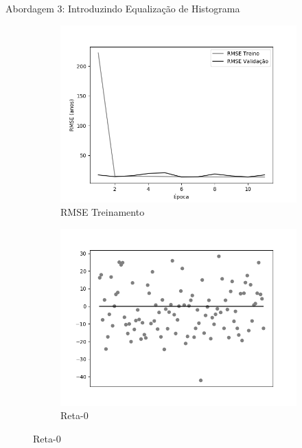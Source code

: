 \begin{frame}{\large{Abordagem 3: Introduzindo Equalização de Histograma}}
  \begin{figure}[ht!]
    \caption{Resultados do treinamento e teste da CNN AlexNet \emph{ReLU}}\label{fig:alexnet-abordagem1}
    \begin{subfigure}[hb]{0.4\linewidth}
      \caption{RMSE Treinamento}

      \includegraphics[width=\linewidth]{img/graficos/history/alexnet/fig-history-image-treat-3-alexnet-relu-rmse.png}
    \end{subfigure}
    \begin{subfigure}[hb]{0.4\linewidth}
      \caption{Reta-0}
      \label{fig:reta0reludying}
      \includegraphics[width=\linewidth]{img/graficos/reta0/alexnet/fig-reta-0-image-treat-3-alexnet-relu.png}%
    \end{subfigure}
\end{figure}
\end{frame}

